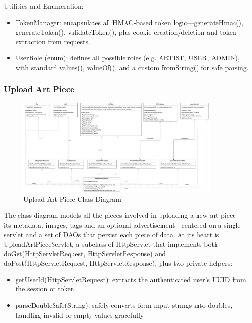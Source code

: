 Utilities and Enumeration:
\begin{itemize}
    \item TokenManager: encapsulates all HMAC‐based token logic—generateHmac(), generateToken(), validateToken(), plus cookie creation/deletion and token extraction from requests.
    \item UserRole (enum): defines all possible roles (e.g. ARTIST, USER, ADMIN), with standard values(), valueOf(), and a custom fromString() for safe parsing.
\end{itemize}

\subsubsection{Upload Art Piece}
\begin{figure}[H]
    \centering
    \includegraphics[width=0.9\textwidth]{images/class_diagrams/UploadArtPiece_classdiagram.pdf}
    \caption{Upload Art Piece Class Diagram}
\end{figure}


The class diagram models all the pieces involved in uploading a new art piece—its metadata, images, tags and an optional advertisement—centered on a single servlet and a set of DAOs that persist each piece of data. At its heart is UploadArtPieceServlet, a subclass of HttpServlet that implements both doGet(HttpServletRequest, HttpServletResponse) and doPost(HttpServletRequest, HttpServletResponse), plus two private helpers:
\begin{itemize}
    \item getUserId(HttpServletRequest): extracts the authenticated user’s UUID from the session or token.
    \item parseDoubleSafe(String): safely converts form‐input strings into doubles, handling invalid or empty values gracefully.
\end{itemize}


